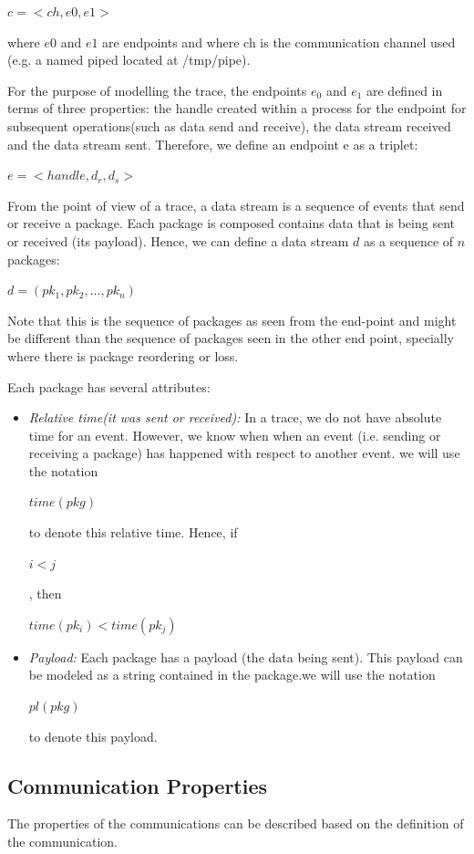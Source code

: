 $c =<ch, e0, e1>$

where $e0$ and $e1$ are endpoints and where ch is the communication channel used (e.g. a named piped located at /tmp/pipe).

For the purpose of modelling the trace, the endpoints $e_0$ and $e_1$ are defined in terms of three properties: the handle created within a process for the endpoint for subsequent operations(such as data send and receive), the data stream received and the data stream sent. Therefore, we define an endpoint e as a triplet:

$ e =<handle, d_r, d_s>$

From the point of view of a trace, a data stream is a sequence of events that send or receive a package. Each package is composed contains data that is being sent or received (its payload). Hence, we can define a data stream $d$ as a sequence of $n$ packages:

$ d = (pk_1, pk_2, ..., pk_n)$ 

Note that this is the sequence of packages as seen from the end-point and might be different than the sequence of packages seen in the other end point, specially where there is package reordering or loss.

Each package has several attributes:
\begin{itemize}
\item \textit{Relative time(it was sent or received):} In a trace, we do not have absolute time for an event. However, we know when when an event (i.e. sending or receiving a package) has happened with respect to another event. we will use the notation 

$time(pkg)$ 

to denote this relative time. Hence, if 

$i < j $

, then 

$time(pk_i) < time(pk_j)$

\item \textit{Payload:} Each package has a payload (the data being sent). This payload can be modeled as a string contained in the package.we will use the notation 

$pl(pkg)$ 

to denote this payload. 

\end{itemize}


\subsection{Communication Properties}
The properties of the communications can be described based on the definition of the communication.


